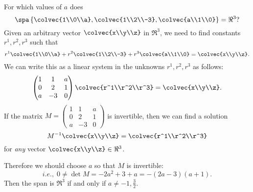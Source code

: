 \begin{example}
For which values of $a$ does
\[
\spa \left\{ \colvec{1\\0\\a} , \colvec{1\\2\\-3} , \colvec{a\\1\\0}   \right\} = \Re^3?
\]
Given an arbitrary vector $\colvec{x\\y\\z}$ in $\Re^3$, we need to find constants $r^1, r^2, r^3$ such that
\[
r^1 \colvec{1\\0\\a} + r^2\colvec{1\\2\\-3} +r^3 \colvec{a\\1\\0} = \colvec{x\\y\\z}.
\]
We can write this as a linear system in the unknowns $r^1, r^2, r^3$ as follows:
\[
\begin{pmatrix}
1 & 1 & a \\ 
0 & 2 & 1 \\
a & -3 & 0
\end{pmatrix}
\colvec{r^1\\r^2\\r^3}
= \colvec{x\\y\\z}.
\]
If the matrix $M=\begin{pmatrix}
1 & 1 & a \\ 
0 & 2 & 1 \\
a & -3 & 0
\end{pmatrix}$ is invertible, then we can find a solution 
\[
M^{-1}\colvec{x\\y\\z}=\colvec{r^1\\r^2\\r^3}
\]
for \emph{any} vector $\colvec{x\\y\\z} \in \Re^3$.

Therefore we should choose $a$ so that $M$ is invertible:  
\[
i.e.,\;  0 \neq \det M = -2a^2 + 3 + a = -(2a-3)(a+1). 
\]
Then the span is $\Re^3$ if and only if $a \neq -1, \frac{3}{2}$.
\end{example}


